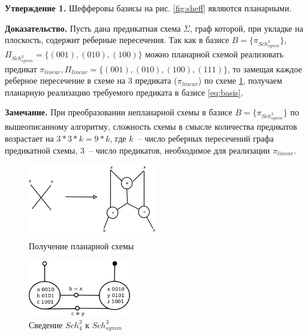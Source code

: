\documentclass[12pt]{article}
\begin{document}
\label{planar_basis}
\textbf{Утверждение 1.} Шефферовы базисы на рис. \ref{fig:sheff} являются планарными.

\textbf{Доказательство.} Пусть дана предикатная схема $\Sigma$, граф которой, при укладке на плоскость, содержит
реберные пересечения. Так как в базисе $B=\{\pi_{Sch_{symm}^3}\}$, $\Pi_{Sch_{symm}^3} = \{ (001), (010), (100) \}$
\label{eq:basis} можно планарной схемой реализовать предикат 
$\pi_{linear}, \Pi_{linear} = \{ (001), (010), (100), (111) \}$, то замещая каждое реберное пересечение в схеме на 
3 предиката ($\pi_{linear}$) по схеме \ref{fig:xor}, получаем планарную реализацию требуемого предиката
в базисе \ref{eq:basis}.

\textbf{Замечание.} При преобразовании непланарной схемы в базисе $B=\{\pi_{Sch_{symm}^3}\}$
по вышеописанному алгоритму, сложность схемы в смысле количества предикатов возрастает на $3*3*k=9*k$, где $k$~-- число реберных
пересечений графа предикатной схемы, $3$~-- число предикатов, необходимое для реализации $\pi_{linear}$.


\begin{figure}[htb]
\centering
\includegraphics[width=0.5\textwidth]{intersection.png}
\caption{Получение планарной схемы}
\label{fig:xor}
\end{figure}


\begin{figure}[htb]
\centering
\includegraphics[width=0.4\textwidth]{scheff4.png}
\caption{Сведение $Sch_4^3$ к $Sch_{symm}^3$}
\label{fig:scheff3_4}
\end{figure}
\end{document}
